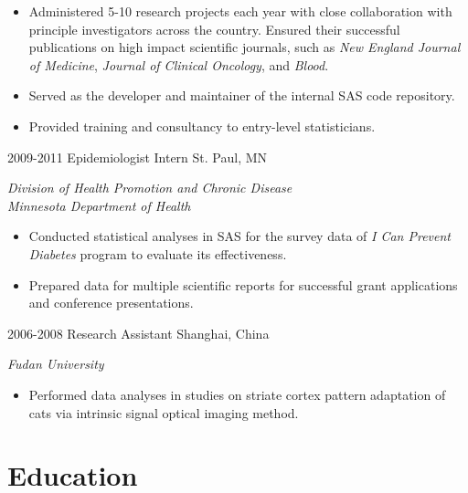 \begin{entrylist}
{\begin{itemize}
        \item Administered 5-10 research projects each year with close collaboration with principle investigators across the country. Ensured their successful publications on high impact scientific journals, such as \textit{New England Journal of Medicine}, \textit{Journal of Clinical Oncology}, and \textit{Blood}.
        \item Served as the developer and maintainer of the internal SAS code repository.
        \item Provided training and consultancy to entry-level statisticians.
      \end{itemize}
    }
  \entry
    {2009-2011}
    {Epidemiologist Intern}
    {St. Paul, MN}
    {
      \textit{Division of Health Promotion and Chronic Disease \\ Minnesota Department of Health}
      \begin{itemize}
        \item Conducted statistical analyses in SAS for the survey data of \textit{I Can Prevent Diabetes} program to evaluate its effectiveness.
        \item Prepared data for multiple scientific reports for successful grant applications and conference presentations.
      \end{itemize}
    }
  \entry
    {2006-2008}
    {Research Assistant}
    {Shanghai, China}
    {
      \textit{Fudan University}
      \begin{itemize}
        \item Performed data analyses in studies on striate cortex pattern adaptation of cats via intrinsic signal optical imaging method.
      \end{itemize}
    }
\end{entrylist}

\section{Education}


